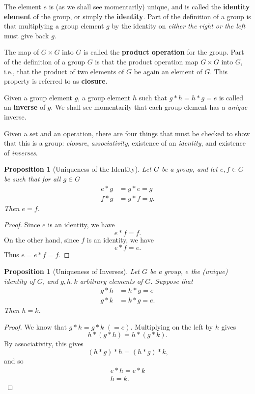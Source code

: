 \documentclass{amsbook}
\theoremstyle{plain}
\newtheorem{proposition}[theorem]{Proposition}
\numberwithin{equation}{chapter}
\numberwithin{theorem}{chapter}
\begin{document}
The element $e$ is (as we shall see momentarily) unique, and is called the
\textbf{identity element} of the group, or simply the \textbf{identity}. Part
of the definition of a group is that multiplying a group element $g$ by the
identity on \textit{either the right or the left} must give back $g$.

The map of $G\times G$ into $G$ is called the \textbf{product operation} for
the group. Part of the definition of a group $G$ is that the product operation
map $G\times G$ into $G$, i.e., that the product of two elements of $G$ be
again an element of $G$. This property is referred to as \textbf{closure}.

Given a group element $g$, a group element $h$ such that $g*h=h*g=e$ is called
an \textbf{inverse} of $g$. We shall see momentarily that each group element
has a \textit{unique} inverse.

Given a set and an operation, there are four things that must be checked to
show that this is a group: \textit{closure}, \textit{associativity}, existence
of an \textit{identity}, and existence of \textit{inverses}.

\begin{proposition}
[Uniqueness of the Identity]Let $G$ be a group, and let $e,f\in G$ be such
that for all $g\in G$%
\begin{align*}
e\ast g  & =g\ast e=g\\
f\ast g  & =g\ast f=g\text{.}%
\end{align*}
Then $e=f$.
\end{proposition}

\begin{proof}
Since $e$ is an identity, we have
\[
e\ast f=f\text{.}%
\]
On the other hand, since $f$ is an identity, we have
\[
e\ast f=e\text{.}%
\]
Thus $e=e\ast f=f$.
\end{proof}

\begin{proposition}
[Uniqueness of Inverses]Let $G$ be a group, $e$ the (unique) identity of $G$,
and $g,h,k$ arbitrary elements of $G$. Suppose that
\begin{align*}
g\ast h  & =h\ast g=e\\
g\ast k  & =k\ast g=e.
\end{align*}
Then $h=k$.
\end{proposition}

\begin{proof}
We know that $g\ast h=g\ast k$ $(=e)$. Multiplying on the left by $h$ gives
\[
h\ast(g\ast h)=h\ast(g\ast k)\text{.}%
\]
By associativity, this gives
\[
(h\ast g)\ast h=(h\ast g)\ast k\text{,}%
\]
and so
\begin{align*}
e\ast h=e\ast k\\
h=k\text{.}%
\end{align*}
\end{proof}
\end{document}
